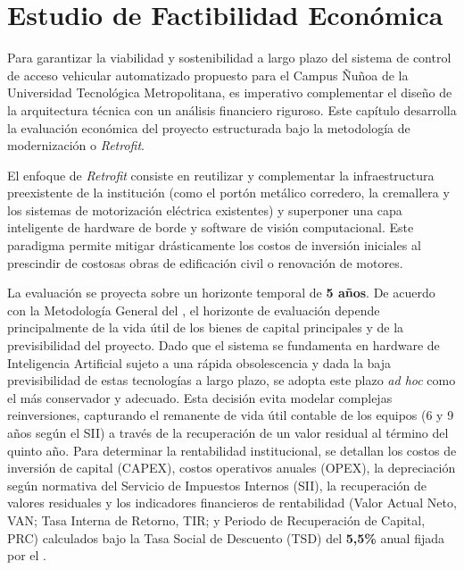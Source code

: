 
\chapter{Estudio de Factibilidad Económica}
\label{cap:factibilidad_economica}

Para garantizar la viabilidad y sostenibilidad a largo plazo del sistema de control de acceso vehicular automatizado propuesto para el Campus Ñuñoa de la Universidad Tecnológica Metropolitana, es imperativo complementar el diseño de la arquitectura técnica con un análisis financiero riguroso. Este capítulo desarrolla la evaluación económica del proyecto estructurada bajo la metodología de modernización o \textit{Retrofit}.

El enfoque de \textit{Retrofit} consiste en reutilizar y complementar la infraestructura preexistente de la institución (como el portón metálico corredero, la cremallera y los sistemas de motorización eléctrica existentes) y superponer una capa inteligente de hardware de borde y software de visión computacional. Este paradigma permite mitigar drásticamente los costos de inversión iniciales al prescindir de costosas obras de edificación civil o renovación de motores.

La evaluación se proyecta sobre un horizonte temporal de \textbf{5 años}. De acuerdo con la Metodología General del \textcite{METODOLOGIAGENERAL2025}, el horizonte de evaluación depende principalmente de la vida útil de los bienes de capital principales y de la previsibilidad del proyecto. Dado que el sistema se fundamenta en hardware de Inteligencia Artificial sujeto a una rápida obsolescencia y dada la baja previsibilidad de estas tecnologías a largo plazo, se adopta este plazo \textit{ad hoc} como el más conservador y adecuado. Esta decisión evita modelar complejas reinversiones, capturando el remanente de vida útil contable de los equipos (6 y 9 años según el SII) a través de la recuperación de un valor residual al término del quinto año. Para determinar la rentabilidad institucional, se detallan los costos de inversión de capital (CAPEX), costos operativos anuales (OPEX), la depreciación según normativa del Servicio de Impuestos Internos (SII), la recuperación de valores residuales y los indicadores financieros de rentabilidad (Valor Actual Neto, VAN; Tasa Interna de Retorno, TIR; y Periodo de Recuperación de Capital, PRC) calculados bajo la Tasa Social de Descuento (TSD) del \textbf{5,5\%} anual fijada por el \textcite{MinisterioDesarrolloSocial}.

